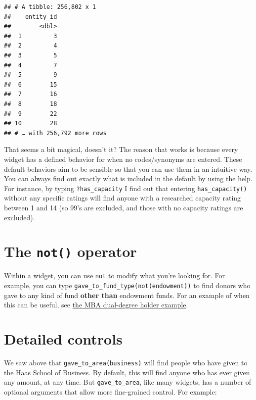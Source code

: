 \documentclass[]{book}
\begin{document}
\begin{verbatim}
## # A tibble: 256,802 x 1
##    entity_id
##        <dbl>
##  1         3
##  2         4
##  3         5
##  4         7
##  5         9
##  6        15
##  7        16
##  8        18
##  9        22
## 10        28
## # … with 256,792 more rows
\end{verbatim}

That seems a bit magical, doesn't it? The reason that works is because every widget has a defined behavior for when no codes/synonyms are entered. These default behaviors aim to be sensible so that you can use them in an intuitive way. You can always find out exactly what is included in the default by using the help. For instance, by typing \texttt{?has\_capacity} I find out that entering \texttt{has\_capacity()} without any specific ratings will find anyone with a researched capacity rating between 1 and 14 (so 99's are excluded, and those with no capacity ratings are excluded).

\hypertarget{widget-not-operator}{%
\section{\texorpdfstring{The \texttt{not()} operator}{The not() operator}}\label{widget-not-operator}}

Within a widget, you can use \texttt{not} to modify what you're looking for. For example, you can type \texttt{gave\_to\_fund\_type(not(endowment))} to find donors who gave to any kind of fund \textbf{other than} endowment funds. For an example of when this can be useful, see \protect\hyperlink{ex-mba-dual}{the MBA dual-degree holder example}.

\hypertarget{detailed-controls}{%
\section{Detailed controls}\label{detailed-controls}}

We saw above that \texttt{gave\_to\_area(business)} will find people who have given to the Haas School of Business. By default, this will find anyone who has ever given any amount, at any time. But \texttt{gave\_to\_area}, like many widgets, has a number of optional arguments that allow more fine-grained control. For example:
\end{document}
